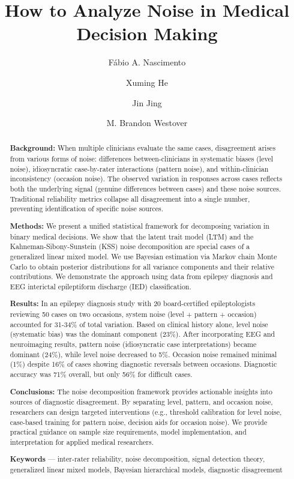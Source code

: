 \documentclass[num-refs]{wiley-article}
\title{How to Analyze Noise in Medical Decision Making}
\author[1]{Fábio A. Nascimento}
\affil[1]{Washington University School of Medicine in St. Louis}
\author[1]{Xuming He}
\affil[1]{Washington University School of Medicine in St. Louis}
\author[2]{Jin Jing}
\affil[2]{Harvard Medical School}
\author[2]{M. Brandon Westover}
\affil[2]{Harvard Medical School}
\begin{document}
\raggedbottom  %

\maketitle
{}

\begin{abstract}
\textbf{Background:} When multiple clinicians evaluate the same cases, disagreement arises from various forms of noise: differences between-clinicians in systematic biases (level noise), idiosyncratic case-by-rater interactions (pattern noise), and within-clinician inconsistency (occasion noise). The observed variation in responses across cases reflects both the underlying signal (genuine differences between cases) and these noise sources. Traditional reliability metrics collapse all disagreement into a single number, preventing identification of specific noise sources.

\textbf{Methods:} We present a unified statistical framework for decomposing variation in binary medical decisions. We show that the latent trait model (LTM) and the Kahneman-Sibony-Sunstein (KSS) noise decomposition are special cases of a generalized linear mixed model. We use Bayesian estimation via Markov chain Monte Carlo to obtain posterior distributions for all variance components and their relative contributions. We demonstrate the approach using data from epilepsy diagnosis and EEG interictal epileptiform discharge (IED) classification.

\textbf{Results:} In an epilepsy diagnosis study with 20 board-certified epileptologists reviewing 50 cases on two occasions, system noise (level + pattern + occasion) accounted for 31-34\% of total variation. Based on clinical history alone, level noise (systematic bias) was the dominant component (23\%). After incorporating EEG and neuroimaging results, pattern noise (idiosyncratic case interpretations) became dominant (24\%), while level noise decreased to 5\%. Occasion noise remained minimal (1\%) despite 16\% of cases showing diagnostic reversals between occasions. Diagnostic accuracy was 71\% overall, but only 56\% for difficult cases.

\textbf{Conclusions:} The noise decomposition framework provides actionable insights into sources of diagnostic disagreement. By separating level, pattern, and occasion noise, researchers can design targeted interventions (e.g., threshold calibration for level noise, case-based training for pattern noise, decision aids for occasion noise). We provide practical guidance on sample size requirements, model implementation, and interpretation for applied medical researchers.

\textbf{Keywords} --- inter-rater reliability, noise decomposition, signal detection theory, generalized linear mixed models, Bayesian hierarchical models, diagnostic disagreement%
\end{abstract}
\end{document}
